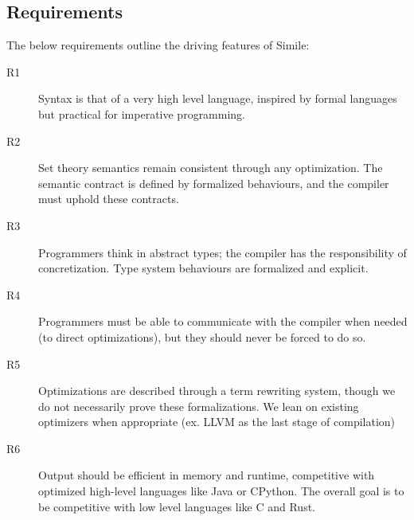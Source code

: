 \subsection{Requirements}
The below requirements outline the driving features of Simile:
\begin{description}
  \item [R1] Syntax is that of a very high level language, inspired by formal languages but practical for imperative programming.
  \item [R2] Set theory semantics remain consistent through any optimization. The semantic contract is defined by formalized behaviours, and the compiler must uphold these contracts.
  \item [R3] Programmers think in abstract types; the compiler has the responsibility of concretization. Type system behaviours are formalized and explicit.
  \item [R4] Programmers must be able to communicate with the compiler when needed (to direct optimizations), but they should never be forced to do so.
  \item [R5] Optimizations are described through a term rewriting system, though we do not necessarily prove these formalizations. We lean on existing optimizers when appropriate (ex. LLVM as the last stage of compilation)
  \item [R6] Output should be efficient in memory and runtime, competitive with optimized high-level languages like Java or CPython. The overall goal is to be competitive with low level languages like C and Rust.
\end{description}
